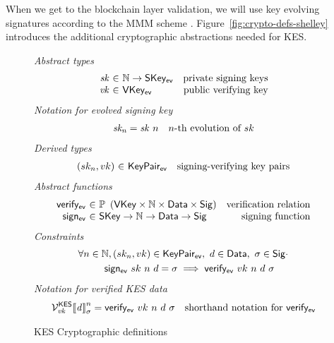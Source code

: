 When we get to the blockchain layer validation, we will use
key evolving signatures according to the MMM scheme \citep{cryptoeprint:2001:034}.
Figure~\ref{fig:crypto-defs-shelley} introduces the additional cryptographic abstractions
needed for KES.


\begin{figure}[htb]
  \emph{Abstract types}
  \begin{equation*}
    \begin{array}{r@{~\in~}lr}
      \var{sk} & \N \to \SKeyEv & \text{private signing keys}\\
      \var{vk} & \VKeyEv & \text{public verifying key}\\
    \end{array}
  \end{equation*}
  \emph{Notation for evolved signing key}
  \begin{align*}
    & \mathit{sk_n} = \mathit{sk}~n & n\text{-th evolution of }sk
  \end{align*}
  \emph{Derived types}
  \begin{equation*}
    \begin{array}{r@{~\in~}lr}
      (sk_n, vk) & \KeyPairEv & \text{signing-verifying key pairs}
    \end{array}
  \end{equation*}
  \emph{Abstract functions}
  \begin{equation*}
    \begin{array}{r@{~\in~}lr}
      \fun{verify_{ev}} & \powerset{\left(\VKey \times \N \times \Data \times \Sig\right)}
                        & \text{verification relation}\\
      \fun{sign_{ev}} & \SKey \to \N \to \Data \to \Sig
                      & \text{signing function}\\
    \end{array}
  \end{equation*}
  \emph{Constraints}
  \begin{align*}
    & \forall n\in\mathbb{N}, (sk_n, vk) \in \mathsf{KeyPair_{ev}}, ~ d \in \mathsf{Data},~ \sigma \in \mathsf{Sig} \cdot \\
    & ~~~~~~~~\mathsf{sign_{ev}} ~ sk ~ n ~ d = \sigma \implies \mathsf{verify_{ev}} ~ vk ~ n ~ d ~ \sigma
  \end{align*}
  \emph{Notation for verified KES data}
  \begin{align*}
    & \mathcal{V}^{\mathsf{KES}}_{\mathit{vk}}{\llbracket \mathit{d} \rrbracket}_{\sigma}^n
        = \mathsf{verify_{ev}} ~ vk ~ n ~ d ~ \sigma
    & \text{shorthand notation for } \mathsf{verify_{ev}}
  \end{align*}
  \caption{KES Cryptographic definitions}
  \label{fig:kes-defs-shelley}
\end{figure}
\clearpage
